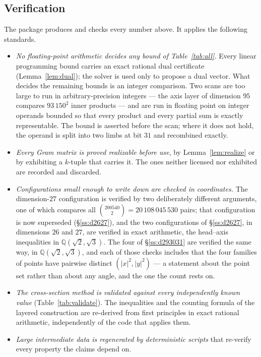 \documentclass[11pt]{amsart}
\theoremstyle{remark}
\begin{document}
\subsection{Verification}\label{ss:verif}

The package \cite{repo} produces and checks every number above. It applies the
following standards.

\begin{itemize}
\item \emph{No floating-point arithmetic decides any bound of
      Table~\ref{tab:all}.} Every linear programming bound carries an exact
      rational dual certificate (Lemma~\ref{lem:dual}); the solver is used only
      to propose a dual vector. What decides the remaining bounds is an integer
      comparison. Two scans are too large to run in arbitrary-precision
      integers --- the axis layer of dimension $95$ compares $93\,150^2$ inner
      products --- and are run in floating point on integer operands bounded so
      that every product and every partial sum is exactly representable. The
      bound is asserted before the scan; where it does not hold, the operand is
      split into two limbs at bit $31$ and recombined exactly.
\item \emph{Every Gram matrix is proved realizable before use}, by
      Lemma~\ref{lem:realize} or by exhibiting a $k$-tuple that carries it. The
      ones neither licensed nor exhibited are recorded and discarded.
\item \emph{Configurations small enough to write down are checked in
      coordinates.} The dimension-$27$ configuration is verified by two
      deliberately different arguments, one of which compares all
      $\binom{200540}{2}=20\,108\,045\,530$ pairs; that configuration is now
      superseded (\S\ref{ss:d2627}), and the two configurations of \S\ref{ss:d2627},
      in dimensions $26$ and $27$, are verified in exact arithmetic, the
      head--axis inequalities in $\mathbb{Q}(\sqrt2,\sqrt3)$. The four of
      \S\ref{ss:d293031} are verified the same way, in
      $\mathbb{Q}(\sqrt2,\sqrt3)$, and each of those checks includes that
      the four families of points have pairwise distinct
      $(|x|^{2},|y|^{2})$ --- a statement about the point set rather than about
      any angle, and the one the count rests on.
\item \emph{The cross-section method is validated against every independently
      known value} (Table~\ref{tab:validate}). The inequalities and the counting
      formula of the layered construction are re-derived from first principles
      in exact rational arithmetic, independently of the code that applies them.
\item \emph{Large intermediate data is regenerated by deterministic scripts}
      that re-verify every property the claims depend on.
\end{itemize}
\end{document}
